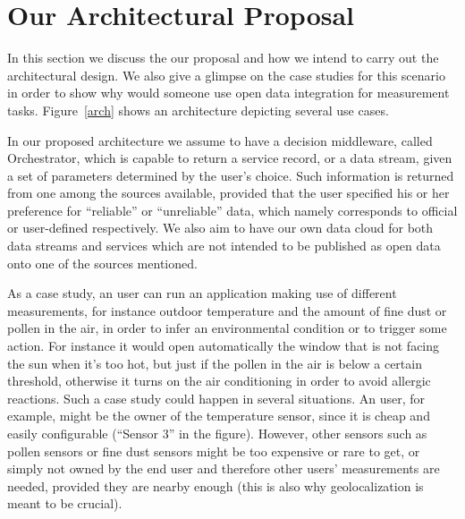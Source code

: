 \section{Our Architectural Proposal}
\label{sec:casestudy}
In this section we discuss the our proposal and how we intend to carry out the architectural design.
We also give a glimpse on the case studies for this scenario in order to show why would someone use open data integration for measurement tasks. Figure~\ref{arch} shows an architecture depicting several use cases.

In our proposed architecture we assume to have a decision middleware, called Orchestrator, which is capable to return a service record, or a data stream, given a set of parameters determined by the user's choice.
Such information is returned from one among the sources available, provided that the user specified his or her preference for ``reliable'' or ``unreliable'' data, which namely corresponds to official or user-defined respectively.
We also aim to have our own data cloud for both data streams and services which are not intended to be published as open data onto one of the sources mentioned.

As a case study, an user can run an application making use of different measurements, for instance outdoor temperature and the amount of fine dust or pollen in the air, in order to infer an environmental condition or to trigger some action.
For instance it would open automatically the window that is not facing the sun when it's too hot, but just if the pollen in the air is below a certain threshold, otherwise it turns on the air conditioning in order to avoid allergic reactions.
Such a case study could happen in several situations.
An user, for example, might be the owner of the temperature sensor, since it is cheap and easily configurable (``Sensor 3'' in the figure).
However, other sensors such as pollen sensors or fine dust sensors might be too expensive or rare to get, or simply not owned by the end user and therefore other users' measurements are needed, provided they are nearby enough (this is also why geolocalization is meant to be crucial).

